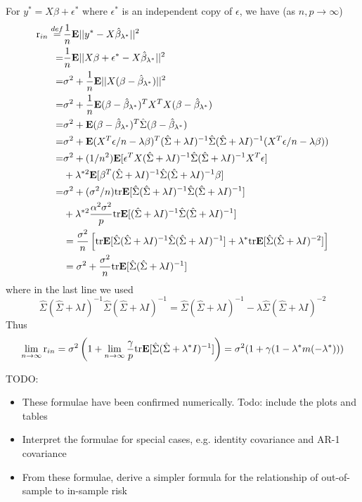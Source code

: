 \documentclass[11pt]{article}
\begin{document}
For $y^* = X \beta + \epsilon^*$ where
$\epsilon^*$ is an independent copy of $\epsilon$, we have (as $n, p
\to \infty$)
\begin{align*}
\text{r}_{in} \stackrel{def}{=}& \frac{1}{n}\textbf{E}||y^* - X\hat{\beta}_{\lambda^*}||^2
\\=& \frac{1}{n}\textbf{E}||X\beta + \epsilon^* - X\hat{\beta}_{\lambda^*}||^2
\\=& \sigma^2 + \frac{1}{n}\textbf{E}||X(\beta - \hat{\beta}_{\lambda^*})||^2
\\=& \sigma^2 + \frac{1}{n} \textbf{E} (\beta - \hat{\beta}_{\lambda^*})^T X^T X (\beta - \hat{\beta}_{\lambda^*})
\\=& \sigma^2 + \textbf{E} (\beta - \hat{\beta}_{\lambda^*})^T \hat{\Sigma} (\beta - \hat{\beta}_{\lambda^*})
\\=& \sigma^2 + \textbf{E} (X^T\epsilon/n - \lambda \beta)^T (\hat{\Sigma} + \lambda I)^{-1} \hat{\Sigma} (\hat{\Sigma} + \lambda I)^{-1} (X^T\epsilon/n - \lambda \beta))
\\=& \sigma^2 + (1/n^2)\textbf{E} [\epsilon^T X (\hat{\Sigma} + \lambda I)^{-1} \hat{\Sigma} (\hat{\Sigma} + \lambda I)^{-1} X^T \epsilon]
\\&+ \lambda^{*2} \textbf{E}[ \beta^T (\hat{\Sigma} + \lambda I)^{-1} \hat{\Sigma} (\hat{\Sigma} + \lambda I)^{-1} \beta]
\\=& \sigma^2 + (\sigma^2/n)\text{tr} \textbf{E} [\hat{\Sigma}(\hat{\Sigma} + \lambda I)^{-1} \hat{\Sigma} (\hat{\Sigma} + \lambda I)^{-1}]
\\&+ \lambda^{*2} \frac{\alpha^2\sigma^2}{p}\text{tr}\textbf{E}[(\hat{\Sigma} + \lambda I)^{-1} \hat{\Sigma} (\hat{\Sigma} + \lambda I)^{-1}]
\\&= \frac{\sigma^2}{n}\left[\text{tr}\textbf{E} [\hat{\Sigma}(\hat{\Sigma} + \lambda I)^{-1} \hat{\Sigma} (\hat{\Sigma} + \lambda I)^{-1}]
 + \lambda^* \text{tr}\textbf{E}[\hat{\Sigma}(\hat{\Sigma} + \lambda I)^{-2}  ]\right]
\\&= \sigma^2 + \frac{\sigma^2}{n} \text{tr}\textbf{E} [\hat{\Sigma}(\hat{\Sigma} + \lambda I)^{-1}]
\end{align*}
where in the last line we used
\[
\hat{\Sigma}(\hat{\Sigma} + \lambda I)^{-1} \hat{\Sigma} (\hat{\Sigma} + \lambda I)^{-1} = \hat{\Sigma}(\hat{\Sigma} + \lambda I)^{-1}  - \lambda \hat{\Sigma}(\hat{\Sigma} + \lambda I)^{-2}
\]
Thus
\[
\lim_{n \to \infty} \text{r}_{in} = \sigma^2 \left(1 + \lim_{n \to \infty} \frac{\gamma}{p} \text{tr}\textbf{E} [\hat{\Sigma}(\hat{\Sigma} + \lambda^* I)^{-1}]\right) = \sigma^2 (1 + \gamma (1- \lambda^* m(-\lambda^*)))
\]

TODO:
\begin{itemize}
\item These formulae have been confirmed numerically.  Todo: include the plots and tables
\item Interpret the formulae for special cases, e.g. identity covariance and AR-1 covariance
\item From these formulae, derive a simpler formula for the relationship of out-of-sample to in-sample risk
\end{itemize}
\end{document}

